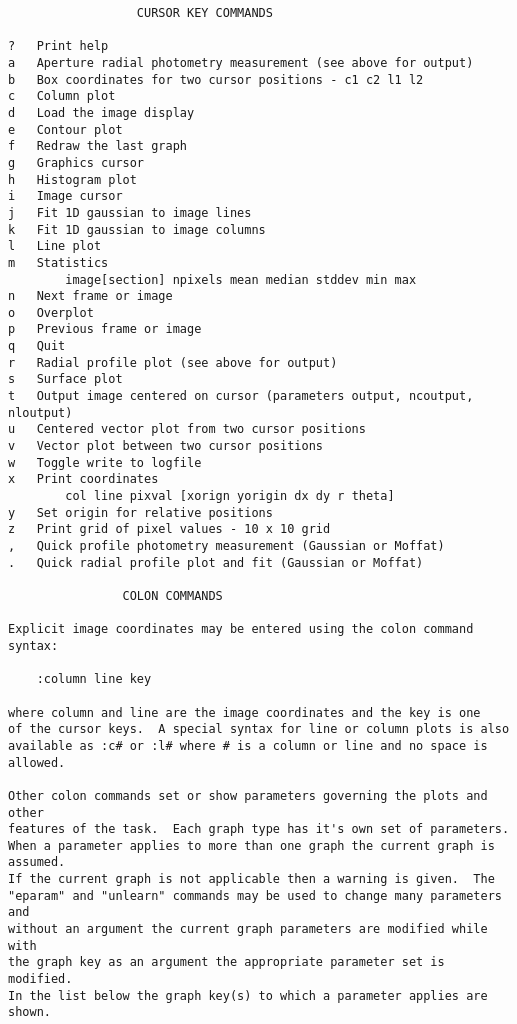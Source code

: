 \begin{verbatim}
			      CURSOR KEY COMMANDS

?	Print help
a	Aperture radial photometry measurement (see above for output)
b	Box coordinates for two cursor positions - c1 c2 l1 l2
c	Column plot
d	Load the image display
e	Contour plot
f	Redraw the last graph
g	Graphics cursor
h	Histogram plot
i	Image cursor
j	Fit 1D gaussian to image lines
k	Fit 1D gaussian to image columns
l	Line plot
m	Statistics
	    image[section] npixels mean median stddev min max
n	Next frame or image
o	Overplot
p	Previous frame or image
q	Quit
r	Radial profile plot (see above for output)
s	Surface plot
t	Output image centered on cursor (parameters output, ncoutput, nloutput)
u	Centered vector plot from two cursor positions
v	Vector plot between two cursor positions
w	Toggle write to logfile
x	Print coordinates
	    col line pixval [xorign yorigin dx dy r theta]
y	Set origin for relative positions
z	Print grid of pixel values - 10 x 10 grid
,	Quick profile photometry measurement (Gaussian or Moffat)
.	Quick radial profile plot and fit (Gaussian or Moffat)

				COLON COMMANDS

Explicit image coordinates may be entered using the colon command syntax:

	:column line key

where column and line are the image coordinates and the key is one
of the cursor keys.  A special syntax for line or column plots is also
available as :c# or :l# where # is a column or line and no space is
allowed.

Other colon commands set or show parameters governing the plots and other
features of the task.  Each graph type has it's own set of parameters.
When a parameter applies to more than one graph the current graph is assumed.
If the current graph is not applicable then a warning is given.  The
"eparam" and "unlearn" commands may be used to change many parameters and
without an argument the current graph parameters are modified while with
the graph key as an argument the appropriate parameter set is modified.
In the list below the graph key(s) to which a parameter applies are shown.


\end{verbatim}

